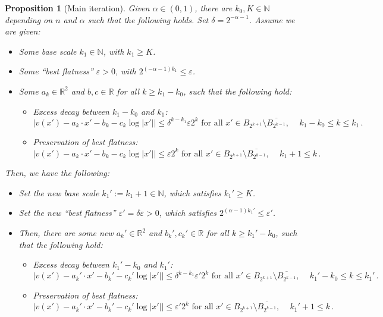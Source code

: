 \documentclass{article}
\newcommand{\N}{\mathbb{N}}
\newcommand{\R}{\mathbb{R}}
\newcommand{\ep}{\varepsilon}
\newtheorem{proposition}[theorem]{Proposition}
\theoremstyle{definition}
\begin{document}
\begin{proposition}[Main iteration]\label{prop:mainiterationB}
    Given $\alpha\in(0,1)$, there are $k_0,K\in\N$ depending on $n$ and $\alpha$ such that the following holds. Set $\delta=2^{-\alpha-1}$. Assume we are given:
    \begin{itemize}
        \item Some base scale $k_1\in\N$, with $k_1\geq K$.
        \item Some ``best flatness'' $\ep>0$, with $2^{(-\alpha-1) k_1}\leq \ep$.
        \item Some $a_k\in \R^2$ and $b,c\in\R$ for all $k\geq k_1-k_0$, such that the following hold:
\begin{itemize}
    \item Excess decay between $k_1-k_0$ and $k_1$:
    $$|v(x')-a_k\cdot x'-b_k-c_k\log|x'||\leq \delta^{k-k_1}\ep 2^{k} \mbox{ for all } x'\in B_{2^{k+1}}\setminus \overline{B_{2^{k-1}}},\,\quad k_1-k_0\leq k \leq k_1\,.$$
    \item Preservation of best flatness: $$|v(x')-a_k\cdot x'-b_k-c_k\log|x'||\leq \ep 2^{k} \mbox{ for all } x'\in B_{2^{k+1}}\setminus \overline{B_{2^{k-1}}},\,\quad k_1+1\leq k \,.$$
\end{itemize}
    \end{itemize}
Then, we have the following:
    \begin{itemize}
        \item Set the new base scale $k_1':=k_1+1\in\N$, which satisfies $k_1'\geq K$.
        \item Set the new ``best flatness'' $\ep'=\delta\ep>0$, which satisfies $2^{(\alpha-1) k_1'}\leq \ep'$.
        \item Then, there are some new $a_k'\in \R^2$ and $b_k',c_k'\in\R$ for all $k\geq k_1'-k_0$, such that the following hold:
\begin{itemize}
    \item Excess decay between $k_1'-k_0$ and $k_1'$:
    $$|v(x')-a_k'\cdot x'-b_k'-c_k'\log|x'||\leq \delta^{k-k_1}\ep' 2^{k} \mbox{ for all } x'\in B_{2^{k+1}}\setminus \overline{B_{2^{k-1}}},\,\quad k_1'-k_0\leq k \leq k_1'\,.$$
    \item Preservation of best flatness: $$|v(x')-a_k'\cdot x'-b_k'-c_k'\log|x'||\leq \ep' 2^{k} \mbox{ for all } x'\in B_{2^{k+1}}\setminus \overline{B_{2^{k-1}}},\,\quad k_1'+1\leq k \,.$$
\end{itemize}
    \end{itemize}
\end{proposition}
\end{document}
